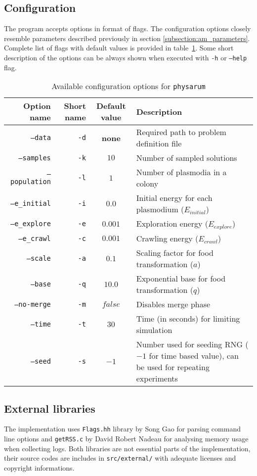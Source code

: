 \subsection{Configuration}

The program accepts options in format of flags. The configuration options closely resemble parameters described previously in section \ref{subsection:am_parameters}. Complete list of flags with default values is provided in table~\ref{table:pi_options}. Some short description of the options can be always shown when executed with \texttt{-h} or \texttt{--help} flag.

\begin{table}[h]
  \centering
  \caption{Available configuration options for \texttt{physarum}}
  \label{table:pi_options}
  \begin{tabularx}{\textwidth}{r|r|c|X}
    Option name & Short name & Default value & Description \\ \hline \hline
    \texttt{--data} & \texttt{-d} & \textbf{none} & Required path to problem definition file \\ \hline
    \texttt{--samples} & \texttt{-k} & $10$ & Number of sampled solutions \\ \hline
    \texttt{--population} & \texttt{-l} & $1$ & Number of plasmodia in a colony \\ \hline
    \texttt{--e\_initial} & \texttt{-i} & $0.0$ & Initial energy for each plasmodium ($E_{initial}$) \\ \hline
    \texttt{--e\_explore} & \texttt{-e} & $0.001$ & Exploration energy ($E_{explore}$) \\ \hline
    \texttt{--e\_crawl} & \texttt{-c} & $0.001$ & Crawling energy ($E_{crawl}$) \\ \hline
    \texttt{--scale} & \texttt{-a} & $0.1$ & Scaling factor for food transformation ($a$) \\ \hline
    \texttt{--base} & \texttt{-q} & $10.0$ & Exponential base for food transformation ($q$) \\ \hline
    \texttt{--no-merge} & \texttt{-m} & $false$ & Disables merge phase \\ \hline
    \texttt{--time} & \texttt{-t} & $30$ & Time (in seconds) for limiting simulation \\ \hline
    \texttt{--seed} & \texttt{-s} & $-1$ & Number used for seeding RNG ($-1$ for time based value), can be used for repeating experiments \\ \hline \hline
  \end{tabularx}
\end{table}

\subsection{External libraries}

The implementation uses \texttt{Flags.hh} library by Song Gao for parsing command line options and \texttt{getRSS.c} by David Robert Nadeau for analysing memory usage when collecting logs. Both libraries are not essential parts of the implementation, their source codes are includes in \texttt{src/external/} with adequate licenses and copyright informations. 

